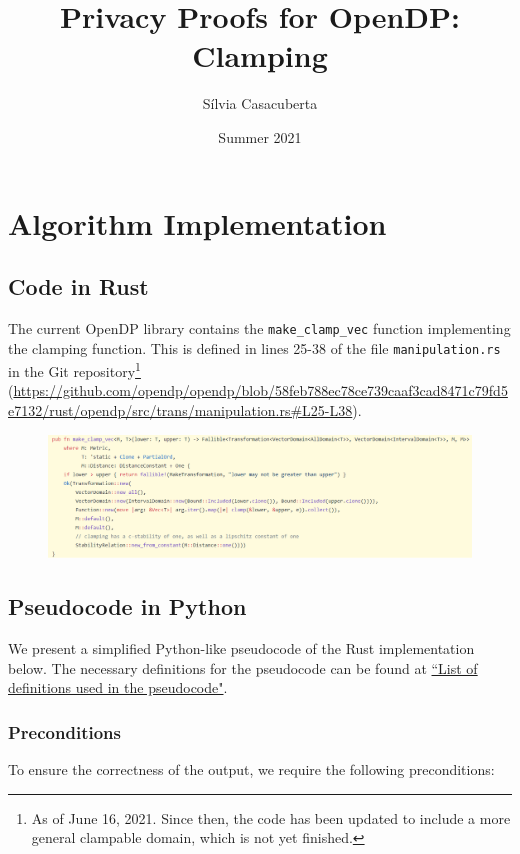 \documentclass[11pt,a4paper]{article}
\title{Privacy Proofs for OpenDP: Clamping}
\author{S\'ilvia Casacuberta}
\date{Summer 2021}
\theoremstyle{definition}
\begin{document}
\maketitle

\tableofcontents

\section{Algorithm Implementation}

\subsection{Code in Rust}
The current OpenDP library contains the \texttt{make\_clamp\_vec} function implementing the clamping function. This is defined in lines 25-38 of the file \texttt{manipulation.rs} in the Git repository\footnote{As of June 16, 2021. Since then, the code has been updated to include a more general clampable domain, which is not yet finished.} (\url{https://github.com/opendp/opendp/blob/58feb788ec78ce739caaf3cad8471c79fd5e7132/rust/opendp/src/trans/manipulation.rs#L25-L38}).

\begin{figure}[ht]
    \includegraphics[width=16cm]{clamp_rust.png}
    \centering
    \label{fig:code}
\end{figure}

\subsection{Pseudocode in Python}\label{sec:pseudocode}
We present a simplified Python-like pseudocode of the Rust implementation below. The necessary definitions for the pseudocode can be found at \href{https://www.overleaf.com/project/60d215bf90b337ac02200a99}{``List of definitions used in the pseudocode"}. 

\subsubsection*{Preconditions}
To ensure the correctness of the output, we require the following preconditions:
\end{document}

